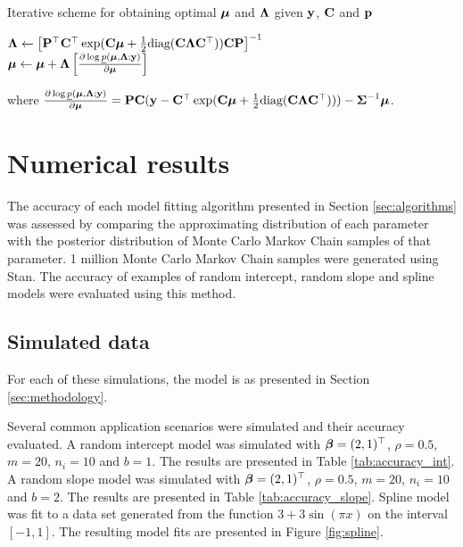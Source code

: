 \documentclass{article}[12pt]
\begin{document}
	\begin{algorithm}
		\caption[Algorithm GVA NR]{Iterative scheme for obtaining optimal ${\boldsymbol \mu}$ and ${\boldsymbol \Lambda}$
			given ${\bf y}$, ${\bf C}$ and ${\bf p}$}
		\label{alg:algorithm_nr}
		\begin{algorithmic}
			\STATE ${\boldsymbol \Lambda} \leftarrow \left [ {\bf P}^\top {\bf C}^\top \exp({\bf C} {\boldsymbol \mu} + \tfrac{1}{2} \text{diag}({\bf C} {\boldsymbol \Lambda} {\bf C}^\top)) {\bf C} {\bf P} \right ]^{-1}$ \\ [1ex]
			\STATE ${\boldsymbol \mu} \leftarrow {\boldsymbol\mu} + {\boldsymbol \Lambda} \left [ \frac{\partial \log \underline{p}({\boldsymbol \mu}, {\boldsymbol \Lambda}; {\bf y})}{\partial {\boldsymbol\mu}} \right ]$
			\ENDWHILE
		\end{algorithmic}
		where $\frac{\partial \log \underline{p}({\boldsymbol \mu}, {\boldsymbol \Lambda}; {\bf y})}{\partial {\boldsymbol\mu}} = {\bf P} {\bf C} ({\bf y} - {\bf C}^\top \exp({\bf C} {\boldsymbol \mu} + \tfrac{1}{2} \text{diag}{({\bf C}{\boldsymbol\Lambda}{\bf C}^\top)})) - {\boldsymbol \Sigma}^{-1} {\boldsymbol \mu}$.
	\end{algorithm}
	
	
	\section{Numerical results}
	\label{sec:results}
	
	The accuracy of each model fitting algorithm presented in Section \ref{sec:algorithms} was assessed by
	comparing the approximating distribution of each parameter with the posterior distribution of Monte Carlo
	Markov Chain samples of that parameter. 1 million Monte Carlo Markov Chain samples were generated using Stan.
	The accuracy of examples of random intercept, random slope and spline models were evaluated using this method.
	
	\subsection{Simulated data}
	
	For each of these simulations, the model is as presented in Section \ref{sec:methodology}.
	
	\noindent Several common application scenarios were simulated and their accuracy evaluated. A random intercept model was simulated with ${\boldsymbol \beta} = (2, 1)^\top$, $\rho = 0.5$, $m = 20$, $n_i = 10$ and $b = 1$. The results are
	presented in Table \ref{tab:accuracy_int}. A random slope model was simulated with ${\boldsymbol \beta} = (2, 1)^\top$,
	$\rho = 0.5$, $m = 20$, $n_i = 10$ and $b = 2$. The results are presented in Table \ref{tab:accuracy_slope}.
	Spline model was fit to a data set generated from the function $3 + 3 \sin{(\pi x)}$ on the interval $[-1,
	1]$. The resulting model fits are presented in Figure \ref{fig:spline}.
	
\end{document}
